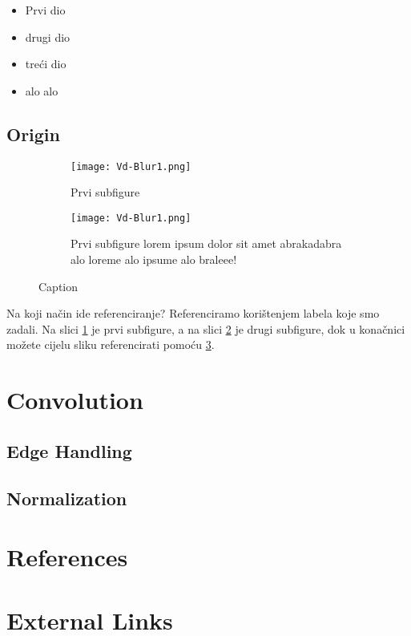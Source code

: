 \documentclass{article}
\begin{document}
\begin{itemize}
    \item Prvi dio
    \item drugi dio
    \item treći dio
    \item alo alo 
\end{itemize}

\subsection{Origin}

\begin{figure}
    \centering
    \begin{subfigure}[t]{.45\linewidth}
        \centering\texttt{[image: Vd-Blur1.png]}
        \caption{Prvi subfigure}\label{fig:1a}
    \end{subfigure} \qquad
    \begin{subfigure}[t]{0.45\linewidth}
        \centering\texttt{[image: Vd-Blur1.png]}
        \caption{Prvi subfigure lorem ipsum dolor sit amet abrakadabra alo loreme alo ipsume alo braleee!}\label{fig:1b}
    \end{subfigure}
    \caption{Caption}
    \label{fig:my_label}
\end{figure}

Na koji način ide referenciranje? Referenciramo korištenjem labela koje smo zadali. Na slici \ref{fig:1a} je prvi subfigure, a na slici \ref{fig:1b} je drugi subfigure, dok u konačnici možete cijelu sliku referencirati pomoću \ref{fig:my_label}.
\section{Convolution}

\subsection{Edge Handling}

\subsection{Normalization}

\section{References}

\section{External Links}

\end{document}
